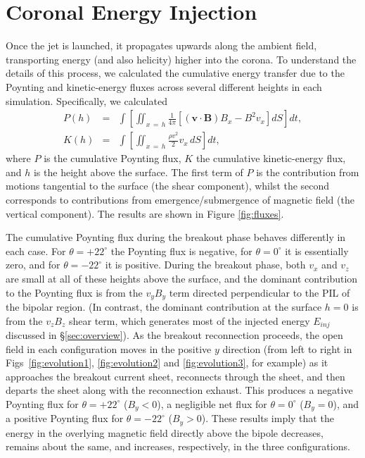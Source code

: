\documentclass[twocolumn]{aastex6}
\begin{document}
\section{Coronal Energy Injection}
\label{sec:fluxes}
Once the jet is launched, it propagates upwards along the ambient field, transporting energy (and also helicity) higher into the corona. To understand the details of this process, we calculated the cumulative energy transfer due to the Poynting and kinetic-energy fluxes across several different heights in each simulation. Specifically, we calculated 
\begin{eqnarray}
P(h) &=& \int{\left[\iint_{x\,=\,h} \frac{1}{4\pi}\left[ (\mathbf{v} \cdot \mathbf{B}) B_{x} - B^{2} v_{x} \right] dS \right]dt}, \label{pflux} \\
K(h) &=& \int{\left[\iint_{x\,=\,h} \frac{\rho v^{2}}{2} v_{x}  \,dS \right]dt}, \label{kflux}
\end{eqnarray}
where $P$ is the cumulative Poynting flux, $K$ the cumulative kinetic-energy flux, and $h$ is the height above the surface. The first term of $P$ is the contribution from motions tangential to the surface (the shear component), whilst the second corresponds to contributions from emergence/submergence of magnetic field (the vertical component). The results are shown in Figure \ref{fig:fluxes}. 

The cumulative Poynting flux during the breakout phase behaves differently in each case. For $\theta = +22^\circ$ the Poynting flux is negative, for $\theta = 0^\circ$ it is essentially zero, and for $\theta = -22^\circ$ it is positive. During the breakout phase, both $v_{x}$ and $v_{z}$ are small at all of these heights above the surface, and the dominant contribution to the Poynting flux is from the $v_{y}B_{y}$ term directed perpendicular to the PIL of the bipolar region. (In contrast, the dominant contribution at the surface $h=0$ is from the $v_{z}B_{z}$ shear term, which generates most of the injected energy $E_{inj}$ discussed in \S \ref{sec:overview}). As the breakout reconnection proceeds, the open field in each configuration moves in the positive $y$ direction (from left to right in Figs\ \ref{fig:evolution1}, \ref{fig:evolution2} and \ref{fig:evolution3}, for example) as it approaches the breakout current sheet, reconnects through the sheet, and then departs the sheet along with the reconnection exhaust. This produces a negative Poynting flux for $\theta = +22^\circ$ ($B_{y} < 0$), a negligible net flux for $\theta = 0^\circ$ ($B_{y}=0$), and a positive Poynting flux for $\theta = -22^\circ$ ($B_{y} > 0$). These results imply that the energy in the overlying magnetic field {directly above the bipole} decreases, remains about the same, and increases, respectively, in the three configurations. 
\end{document}
